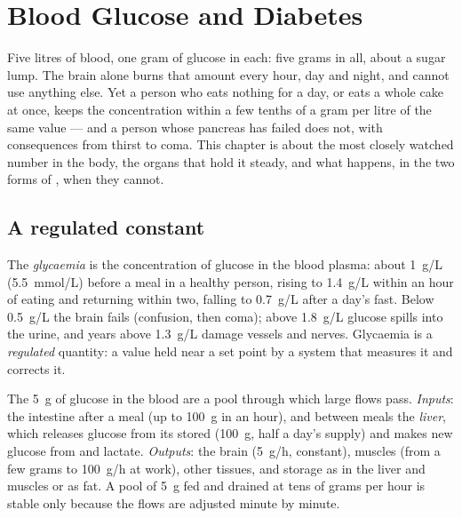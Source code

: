 \chapter{Blood Glucose and Diabetes}\label{ch:g12:glucose-and-diabetes}

Five litres of blood, one gram of glucose in each: five grams in all,
about a sugar lump. The brain alone burns that amount every hour, day
and night, and cannot use anything else. Yet a person who eats
nothing for a day, or eats a whole cake at once, keeps the
concentration within a few tenths of a gram per litre of the same
value --- and a person whose pancreas has failed does not, with
consequences from thirst to coma. This chapter is about the most
closely watched number in the body, the organs that hold it steady,
and what happens, in the two forms of , when they cannot.

\section{A regulated constant}

\begin{definition}[Glycaemia]\label{def:g12:glucose-and-diabetes:glycaemia}
The \emph{glycaemia} is the concentration of glucose
in the blood plasma: about \qty{1}{g/L} (\qty{5.5}{mmol/L}) before a
meal in a healthy person, rising to \qty{1.4}{g/L} within an hour of
eating and returning within two, falling to \qty{0.7}{g/L} after a
day's fast. Below \qty{0.5}{g/L} the brain fails (confusion, then
coma); above \qty{1.8}{g/L} glucose spills into the urine, and years
above \qty{1.3}{g/L} damage vessels and nerves. Glycaemia is a
\emph{regulated} quantity: a value held near a set point by a system
that measures it and corrects it.
\end{definition}

\begin{proposition}\label{prop:g12:glucose-and-diabetes:pool}
The \qty{5}{g} of glucose in the blood are a pool through which large
flows pass. \emph{Inputs}: the intestine after a meal (up to
\qty{100}{g} in an hour), and between meals the \emph{liver}, which
releases glucose from its stored \emph{} (\qty{100}{g}, half a
day's supply) and makes new glucose from  and lactate.
\emph{Outputs}: the brain (\qty{5}{g/h}, constant), muscles (from a
few grams to \qty{100}{g/h} at work), other tissues, and storage as
 in the liver and muscles or as fat. A pool of \qty{5}{g} fed
and drained at tens of grams per hour is stable only because the
flows are adjusted minute by minute.
\end{proposition}
\admitted

